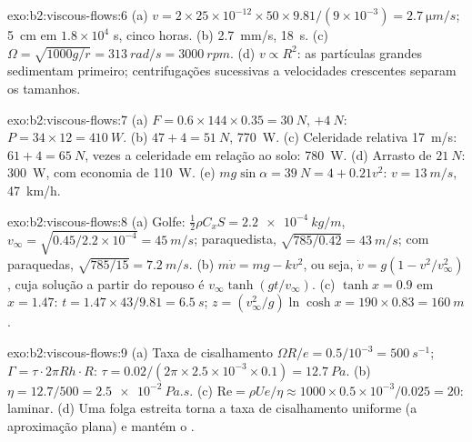 \begin{solution}{exo:b2:viscous-flows:6}
(a) $v = 2 \times 25 \times 10^{-12} \times 50 \times 9.81/(9 \times 10^{-3}) = \qty{2.7}{\micro m/s}$;
\qty{5}{cm} em $1.8 \times 10^4$ s, cinco horas. (b) \qty{2.7}{mm/s}, \qty{18}{s}. (c)
$\Omega = \sqrt{1000g/r} = \qty{313}{rad/s} = \qty{3000}{rpm}$. (d) $v \propto R^2$: as partículas
grandes sedimentam primeiro; centrifugações sucessivas a velocidades crescentes separam
os tamanhos.
\end{solution}

\begin{solution}{exo:b2:viscous-flows:7}
(a) $F = 0.6 \times 144 \times 0.35 = \qty{30}{N}$, $+\qty{4}{N}$: $P = 34 \times 12 =
\qty{410}{W}$. (b) $47 + 4 = \qty{51}{N}$, \qty{770}{W}. (c) Celeridade relativa
\qty{17}{m/s}: $61 + 4 = \qty{65}{N}$, vezes a celeridade em relação ao solo: \qty{780}{W}. (d)
Arrasto de $\qty{21}{N}$: \qty{300}{W}, com economia de \qty{110}{W}. (e) $mg\sin\alpha = \qty{39}{N} =
4 + 0.21v^2$: $v = \qty{13}{m/s}$, \qty{47}{km/h}.
\end{solution}

\begin{solution}{exo:b2:viscous-flows:8}
(a) Golfe: $\tfrac12\rho C_xS = \qty{2.2e-4}{kg/m}$, $v_\infty = \sqrt{0.45/2.2 \times 10^{-4}}
= \qty{45}{m/s}$; paraquedista, $\sqrt{785/0.42} = \qty{43}{m/s}$; com paraquedas, $\sqrt{785/15} =
\qty{7.2}{m/s}$. (b) $m\dot v = mg - kv^2$, ou seja, $\dot v = g(1 - v^2/v_\infty^2)$,
cuja solução a partir do repouso é $v_\infty\tanh(gt/v_\infty)$. (c) $\tanh x = 0.9$ em
$x = 1.47$: $t = 1.47 \times 43/9.81 = \qty{6.5}{s}$; $z = (v_\infty^2/g)\ln\cosh x =
190 \times 0.83 = \qty{160}{m}$.
\end{solution}

\begin{solution}{exo:b2:viscous-flows:9}
(a) Taxa de cisalhamento $\Omega R/e = 0.5/10^{-3} = \qty{500}{s^{-1}}$; $\Gamma = \tau\cdot2\pi Rh
\cdot R$: $\tau = 0.02/(2\pi \times 2.5 \times 10^{-3} \times 0.1) = \qty{12.7}{Pa}$. (b) $\eta
= 12.7/500 = \qty{2.5e-2}{Pa.s}$. (c) $\mathrm{Re} = \rho Ue/\eta \approx 1000 \times 0.5 \times
10^{-3}/0.025 = 20$: laminar. (d) Uma folga estreita torna a taxa de cisalhamento uniforme
(a aproximação plana) e mantém o .
\end{solution}

